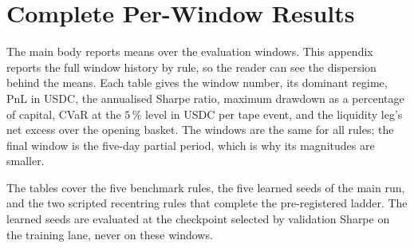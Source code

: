 \section{Complete Per-Window Results}
\label{app:results}

The main body reports means over the evaluation windows. This appendix reports
the full window history by rule, so the reader can see the dispersion behind
the means. Each table gives the window number, its dominant regime, PnL in USDC,
the annualised Sharpe ratio, maximum drawdown as a percentage of capital, CVaR
at the $5\,\%$ level in USDC per tape event, and the liquidity leg's net excess
over the opening basket. The windows are the same for all rules; the final
window is the five-day partial period, which is why its magnitudes are smaller.

The tables cover the five benchmark rules, the five learned seeds of the main
run, and the two scripted recentring rules that complete the pre-registered
ladder. The learned seeds are evaluated at the checkpoint selected by
validation Sharpe on the training lane, never on these windows.


